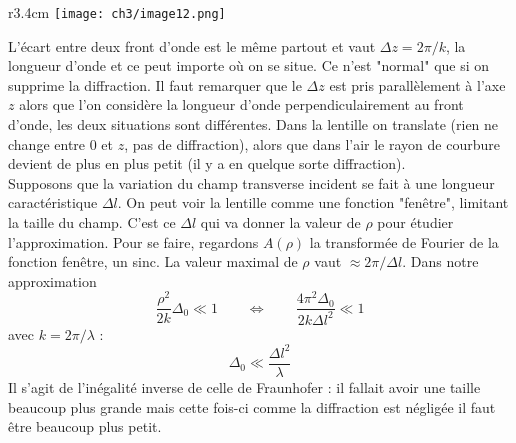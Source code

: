 	\begin{wrapfigure}[8]{r}{3.4cm}
	\vspace{-5mm}
	\texttt{[image: ch3/image12.png]}
	\end{wrapfigure}				
	L'écart entre deux front d'onde est le même partout et vaut $\Delta z = 2\pi/k$, la longueur d'onde et 
	ce peut importe où on se situe. Ce n'est "normal" que si on supprime la diffraction. Il faut remarquer 
	que le $\Delta z$ est pris parallèlement à l'axe $z$ alors que l'on considère la longueur d'onde 
	perpendiculairement au front d'onde, les deux situations sont différentes. Dans la lentille on translate (rien 	    ne change entre 0 et $z$, pas de diffraction), alors que dans l'air le rayon de courbure devient de plus en plus petit (il y a en quelque sorte diffraction).\\

	Supposons que la variation du champ transverse incident se fait à une longueur caractéristique $\Delta l$. 
	On peut voir la lentille comme une fonction "fenêtre", limitant la taille du champ. C'est ce $\Delta l$ qui 
	va donner la valeur de $\rho$ pour étudier l'approximation. Pour se faire, regardons $A(\rho)$ la 
	transformée de Fourier de la fonction fenêtre, un sinc. La valeur maximal de $\rho$ vaut $\approx 2\pi/
	\Delta l$. Dans notre approximation
	\begin{equation}
	\frac{\rho^2}{2k}\Delta_0 \ll 1\qquad \Leftrightarrow\qquad \dfrac{4\pi^2\Delta_0}{2k\Delta l^2}\ll 1
	\end{equation}
	avec $k=2\pi/\lambda$ :
	\begin{equation}
	\Delta_0 \ll \dfrac{\Delta l^2}{\lambda}
	\end{equation}
	Il s'agit de l'inégalité inverse de celle de Fraunhofer : il fallait avoir une taille beaucoup plus grande 
	mais cette fois-ci comme la diffraction est négligée il faut être beaucoup plus petit.\\
	
